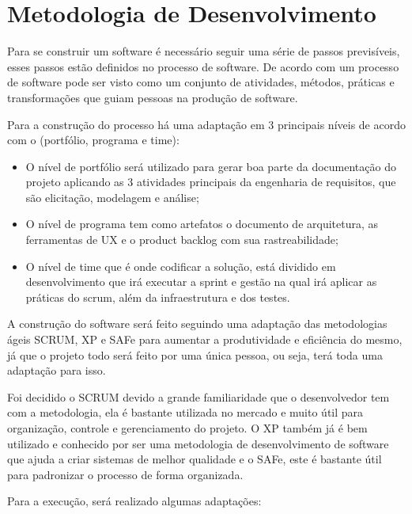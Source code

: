 \section{Metodologia de Desenvolvimento}

Para se construir um software é necessário seguir uma série de passos previsíveis, esses passos estão definidos no processo de software. De acordo com \cite{pressman} um processo de software pode ser visto como um conjunto de atividades, métodos, práticas e transformações que guiam pessoas na produção de software.

Para a construção do processo há uma adaptação em 3 principais níveis de acordo com o \cite{safe} (portfólio, programa e time):

\begin{itemize}
  \item O nível de portfólio será utilizado para gerar boa parte da documentação do projeto aplicando as 3 atividades principais da engenharia de requisitos, que são elicitação, modelagem e análise;
  \item O nível de programa tem como artefatos o documento de arquitetura, as ferramentas de UX e o product backlog com sua rastreabilidade;
  \item O nível de time que é onde codificar a solução, está dividido em desenvolvimento que irá executar a sprint e gestão na qual irá aplicar as práticas do scrum, além da infraestrutura e dos testes.
\end{itemize}

A construção do software será feito seguindo uma adaptação das metodologias ágeis SCRUM, XP e SAFe para aumentar a produtividade e eficiência do mesmo, já que o projeto todo será feito por uma única pessoa, ou seja, terá toda uma adaptação para isso.

Foi decidido o SCRUM devido a grande familiaridade que o desenvolvedor tem com a metodologia, ela é bastante utilizada no mercado e muito útil para organização, controle e gerenciamento do projeto. O XP também já é bem utilizado e conhecido por ser uma metodologia de desenvolvimento de software que ajuda a criar sistemas de melhor qualidade e o SAFe, este é bastante útil para padronizar o processo de forma organizada.

Para a execução, será realizado algumas adaptações:

